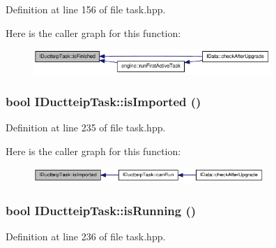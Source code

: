Definition at line 156 of file task.hpp.

Here is the caller graph for this function:\nopagebreak
\begin{figure}[H]
\begin{center}
\leavevmode
\includegraphics[width=255pt]{class_i_ductteip_task_ab92791950ee2fe51cf1005421cb87695_icgraph}
\end{center}
\end{figure}
\hypertarget{class_i_ductteip_task_a5b644c2fc03f581eb1b1b077a4bae8e0}{
\subsubsection[{isImported}]{\setlength{\rightskip}{0pt plus 5cm}bool IDuctteipTask::isImported ()}}
\label{class_i_ductteip_task_a5b644c2fc03f581eb1b1b077a4bae8e0}


Definition at line 235 of file task.hpp.

Here is the caller graph for this function:\nopagebreak
\begin{figure}[H]
\begin{center}
\leavevmode
\includegraphics[width=248pt]{class_i_ductteip_task_a5b644c2fc03f581eb1b1b077a4bae8e0_icgraph}
\end{center}
\end{figure}
\hypertarget{class_i_ductteip_task_a91d7a4855bd1f2b82608c4da8f4dd778}{
\subsubsection[{isRunning}]{\setlength{\rightskip}{0pt plus 5cm}bool IDuctteipTask::isRunning ()}}
\label{class_i_ductteip_task_a91d7a4855bd1f2b82608c4da8f4dd778}


Definition at line 236 of file task.hpp.

